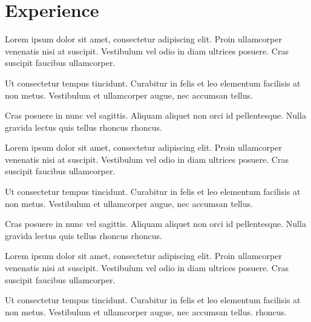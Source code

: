 \documentclass[]{PlushCV}
\begin{document}
\begin{minipage}[t]{0.70\textwidth}



\section{Experience}
\vspace{\topsep} %
\begin{tightemize}
\sectionsep
\item Lorem ipsum dolor sit amet, consectetur adipiscing elit. Proin ullamcorper venenatis nisi at suscipit. Vestibulum vel odio in diam ultrices posuere. Cras suscipit faucibus ullamcorper.
\item Ut consectetur tempus tincidunt. Curabitur in felis et leo elementum facilisis at non metus. Vestibulum et ullamcorper augue, nec accumsan tellus. \item Cras posuere in nunc vel sagittis. Aliquam aliquet non orci id pellentesque. Nulla gravida lectus quis tellus rhoncus rhoncus.
\end{tightemize}
\sectionsep

\begin{tightemize}
\sectionsep
\item Lorem ipsum dolor sit amet, consectetur adipiscing elit. Proin ullamcorper venenatis nisi at suscipit. Vestibulum vel odio in diam ultrices posuere. Cras suscipit faucibus ullamcorper.
\item Ut consectetur tempus tincidunt. Curabitur in felis et leo elementum facilisis at non metus. Vestibulum et ullamcorper augue, nec accumsan tellus.
\item Cras posuere in nunc vel sagittis. Aliquam aliquet non orci id pellentesque. Nulla gravida lectus quis tellus rhoncus rhoncus.
\end{tightemize}
\sectionsep

\begin{tightemize}
\sectionsep
\item Lorem ipsum dolor sit amet, consectetur adipiscing elit. Proin ullamcorper venenatis nisi at suscipit. Vestibulum vel odio in diam ultrices posuere. Cras suscipit faucibus ullamcorper.
\item Ut consectetur tempus tincidunt. Curabitur in felis et leo elementum facilisis at non metus. Vestibulum et ullamcorper augue, nec accumsan tellus.
 rhoncus.
\end{tightemize}
\sectionsep



\end{minipage}
\end{document}
